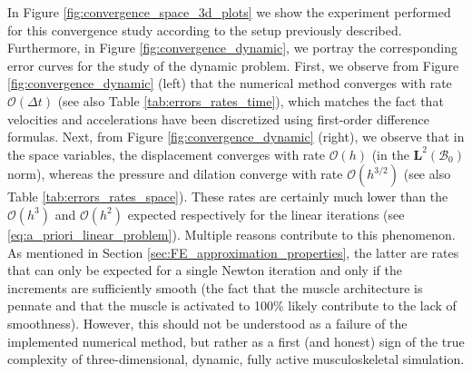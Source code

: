 \documentclass{sfuthesis}
\numberwithin{equation}{section}
\numberwithin{figure}{chapter}
\numberwithin{table}{chapter}
\theoremstyle{definition}
\def\*#1{{\mathbf{#1}}} %
\newcommand{\B}{\mathcal{B}}
\begin{document}
In Figure \ref{fig:convergence_space_3d_plots} we show the experiment performed for this convergence study according to the setup previously described. Furthermore, in Figure \ref{fig:convergence_dynamic}, we portray the corresponding error curves for the study of the dynamic problem. First, we observe from Figure \ref{fig:convergence_dynamic} (left) that the numerical method converges with rate $\mathcal{O}(\Delta t)$ (see also Table \ref{tab:errors_rates_time}), which matches the fact that velocities and accelerations have been discretized using first-order difference formulas. Next, from Figure \ref{fig:convergence_dynamic} (right), we observe that in the space variables, the displacement converges with rate $\mathcal{O}(h)$ (in the $\*L^2(\B_0)$ norm), whereas the pressure and dilation converge with rate $\mathcal{O}(h^{3/2})$ (see also Table \ref{tab:errors_rates_space}). These rates are certainly much lower than the $\mathcal{O}(h^3)$ and $\mathcal{O}(h^2)$ expected respectively for the linear iterations (see \eqref{eq:a_priori_linear_problem}). Multiple reasons contribute to this phenomenon. As mentioned in Section \ref{sec:FE_approximation_properties}, the latter are rates that can only be expected for a single Newton iteration and only if the increments are sufficiently smooth (the fact that the muscle architecture is pennate and that the muscle is activated to 100\% likely contribute to the lack of smoothness). However, this should not be understood as a failure of the implemented numerical method, but rather as a first (and honest) sign of the true complexity of three-dimensional, dynamic, fully active musculoskeletal simulation. 
\end{document}
